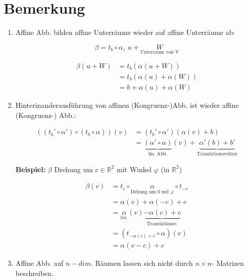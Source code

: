 \documentclass[a4paper, openany]{book}
\begin{document}
        \section{Bemerkung}

        \begin{enumerate}[label=(\alph*)]
          \item Affine Abb. bilden affine Unterräume wieder auf affine Unterräume ab:

          \[ \beta = t_b \circ \alpha, \ u+ \underset{\text{Unterraum von V}}{W} \]

          \begin{align*}
            \beta(u+W) & = t_b (\alpha(u+W)) \\
                       & = t_b (\alpha(u) + \alpha(W)) \\
                       & = b + \alpha(u) + \alpha(W) 
          \end{align*}

          \item Hinterinanderausführung von affinen (Kongruenz-)Abb. ist wieder affine  (Kongruenz-) Abb.:

          \begin{align*}
            ((t_b' \circ \alpha') \circ (t_b \circ \alpha))(v) & = (t_b' \circ \alpha') (\alpha(v) + b) \\
                                                               & = \underbrace{(\alpha' \circ \alpha)}_{\text{lin. Abb.}}(v) + \underbrace{\alpha'(b) +b'}_{\text{Translationsvektor}}
          \end{align*}

          \textbf{Beispiel:} $\beta$ Drehung um $c \in \mathbb{R}^2$ mit Winkel $\varphi$ (in $\mathbb{R}^2$)

        \begin{align*}
          \beta(v) & = t_c \circ \underset{\text{Dehung um 0 mit $\varphi$}}{\alpha} \circ t_{-c} \\
                   & = \alpha(v) + \alpha(-c) + c \\
                   & = \underset{lin.}{\alpha}(v) \underbrace{- \alpha(c) + c}_{\text{Translationsv.}} \\
                   & = (t_{-\alpha(c) +c} \circ \alpha)(v) \\
                   & = \alpha(v-c) + c
        \end{align*}

        \item Affine Abb. auf $n-dim$. Räumen lassen sich nicht durch $n \times n$- Matrizen beschreiben.


\end{enumerate}
\end{document}
